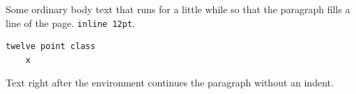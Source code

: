 \documentclass[12pt]{article}
\begin{document}
Some ordinary body text that runs for a little while so that the paragraph fills a line of the page. \verb|inline 12pt|.
\begin{verbatim}
twelve point class
	x
\end{verbatim}
Text right after the environment continues the paragraph without an indent.
\end{document}
